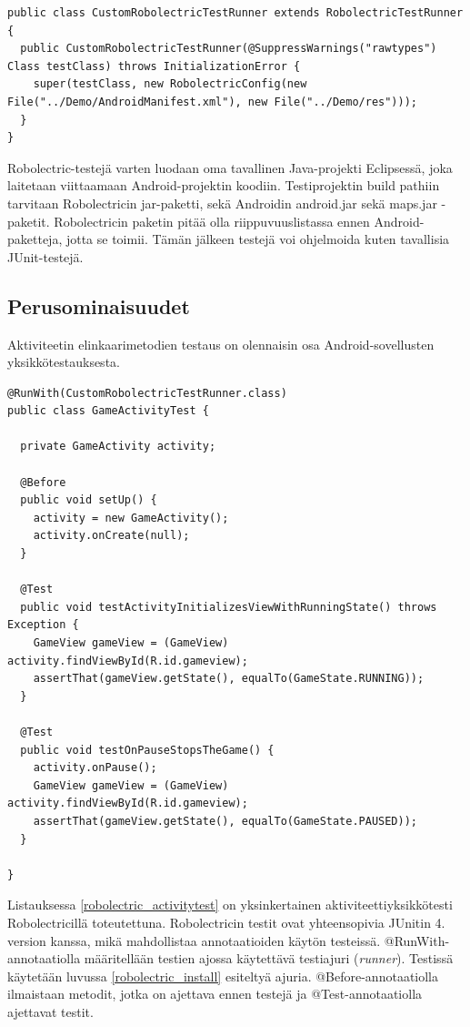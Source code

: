 \begin{lstlisting}[float,label=robolectric_runner,caption=CustomRobolectricTestRunner]
public class CustomRobolectricTestRunner extends RobolectricTestRunner {
  public CustomRobolectricTestRunner(@SuppressWarnings("rawtypes") Class testClass) throws InitializationError {
  	super(testClass, new RobolectricConfig(new File("../Demo/AndroidManifest.xml"), new File("../Demo/res")));
  }
}
\end{lstlisting}

Robolectric-testejä varten luodaan oma tavallinen Java-projekti Eclipsessä, joka laitetaan viittaamaan Android-projektin koodiin. Testiprojektin build pathiin tarvitaan Robolectricin jar-paketti, sekä Androidin android.jar sekä maps.jar -paketit. Robolectricin paketin pitää olla riippuvuuslistassa ennen Android-paketteja, jotta se toimii. Tämän jälkeen testejä voi ohjelmoida kuten tavallisia JUnit-testejä.

\subsection{Perusominaisuudet}
\label{basic_unittests}

Aktiviteetin elinkaarimetodien testaus on olennaisin osa Android-sovellusten yksikkötestauksesta. 

\begin{lstlisting}[float,label=robolectric_activitytest,caption=Yksinkertainen aktiviteettiyksikkötesti Robolectricilla]
@RunWith(CustomRobolectricTestRunner.class)
public class GameActivityTest {

  private GameActivity activity;

  @Before
  public void setUp() {
    activity = new GameActivity();
    activity.onCreate(null);
  }

  @Test
  public void testActivityInitializesViewWithRunningState() throws Exception {
    GameView gameView = (GameView) activity.findViewById(R.id.gameview);
    assertThat(gameView.getState(), equalTo(GameState.RUNNING));
  }
  
  @Test
  public void testOnPauseStopsTheGame() {
  	activity.onPause();
  	GameView gameView = (GameView) activity.findViewById(R.id.gameview);
  	assertThat(gameView.getState(), equalTo(GameState.PAUSED));
  }
  
}
\end{lstlisting}

Listauksessa \ref{robolectric_activitytest} on yksinkertainen aktiviteettiyksikkötesti Robolectricillä toteutettuna. Robolectricin testit ovat yhteensopivia JUnitin 4. version kanssa, mikä mahdollistaa annotaatioiden käytön testeissä. @RunWith-annotaatiolla määritellään testien ajossa käytettävä testiajuri (\emph{runner}). Testissä käytetään luvussa \ref{robolectric_install} esiteltyä ajuria. @Before-annotaatiolla ilmaistaan metodit, jotka on ajettava ennen testejä ja @Test-annotaatiolla ajettavat testit.

